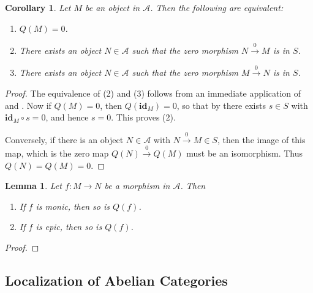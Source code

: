 \documentclass[11pt]{article}
\theoremstyle{thmstyle}
\newtheorem{lemma}[theorem]{Lemma}
\theoremstyle{defstyle}
\newtheorem{corollary}[theorem]{Corollary}
\newcommand{\id}{\mathbf{id}}
\newcommand{\scrA}{\mathscr{A}}
\begin{document}
\begin{corollary}
	Let $M$ be an object in $\scrA$. Then the following are equivalent: 
	\begin{enumerate}[label=(\arabic*)]
		\item $Q(M) = 0$. 
		\item There exists an object $N\in\scrA$ such that the zero morphism $N\xrightarrow{0} M$ is in $S$.
		\item There exists an object $N\in\scrA$ such that the zero morphism $M\xrightarrow{0} N$ is in $S$.
	\end{enumerate}
\end{corollary}
\begin{proof}
	The equivalence of (2) and (3) follows from an immediate application of  and . Now if $Q(M) = 0$, then $Q(\id_M) = 0$, so that by  there exists $s\in S$ with $\id_M\circ s = 0$, and hence $s = 0$. This proves (2).
	
	Conversely, if there is an object $N\in\scrA$ with $N\xrightarrow{0} M \in S$, then the image of this map, which is the zero map $Q(N)\xrightarrow{0} Q(M)$ must be an isomorphism. Thus $Q(N) = Q(M) = 0$.
\end{proof}

\begin{lemma}
	Let $f\colon M\to N$ be a morphism in $\scrA$. Then 
	\begin{enumerate}[label=(\arabic*)]
		\item If $f$ is monic, then so is $Q(f)$. 
		\item If $f$ is epic, then so is $Q(f)$.
	\end{enumerate}
\end{lemma}
\begin{proof}
\end{proof}

\subsection{Localization of Abelian Categories}
\end{document}
